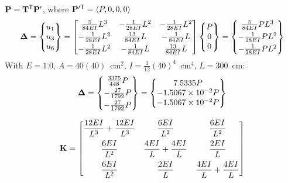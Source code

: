 $\mathbf{P} = \mathbf{T}^{\mathsf{T}}\mathbf{P}'$, where $\mathbf{P}'^{\mathsf{T}} = \langle P, 0, 0, 0\rangle$
\begin{equation*}
  \bm{\Delta} = \begin{Bmatrix}u_1\\ u_3\\ u_6\end{Bmatrix} = \begin{bmatrix}\frac{5}{84EI}L^3 & -\frac{1}{28EI}L^2 & -\frac{1}{28EI}L^2\\[3pt] -\frac{1}{28EI}L^2 & \frac{13}{84EI}L & -\frac{1}{84EI}L\\[3pt] -\frac{1}{28EI}L^2 & -\frac{1}{84EI}L & \frac{13}{84EI}L\end{bmatrix}\begin{Bmatrix}P\\ 0\\ 0\end{Bmatrix} = \begin{Bmatrix}\frac{5}{84EI}PL^3\\[3pt] -\frac{1}{28EI}PL^2\\[3pt] -\frac{1}{28EI}PL^2\end{Bmatrix}
\end{equation*}
With $E = 1.0$, $A = 40(40)$~cm$^2$, $I = \frac{1}{12}(40)^4$~cm$^4$, $L = 300$~cm:
\begin{equation*}
  \bm{\Delta} = \begin{Bmatrix}\frac{3375}{448}P\\[3pt] -\frac{27}{1792}P\\[3pt] -\frac{27}{1792}P\end{Bmatrix} = \begin{Bmatrix}7.5335P\\ -1.5067\times10^{-2}P\\ -1.5067\times10^{-2}P\end{Bmatrix}
\end{equation*}
\begin{center}
\begin{minipage}{0.4\linewidth}\centering\end{minipage}\hfill
\begin{minipage}{0.55\linewidth}
\begin{equation*}
  \mathbf{K} = \begin{bmatrix}
    \dfrac{12EI}{L^3} + \dfrac{12EI}{L^3} & \dfrac{6EI}{L^2} & \dfrac{6EI}{L^2}\\[8pt]
    \dfrac{6EI}{L^2} & \dfrac{4EI}{L} + \dfrac{4EI}{L} & \dfrac{2EI}{L}\\[8pt]
    \dfrac{6EI}{L^2} & \dfrac{2EI}{L} & \dfrac{4EI}{L} + \dfrac{4EI}{L}
  \end{bmatrix}
\end{equation*}
\end{minipage}
\end{center}

